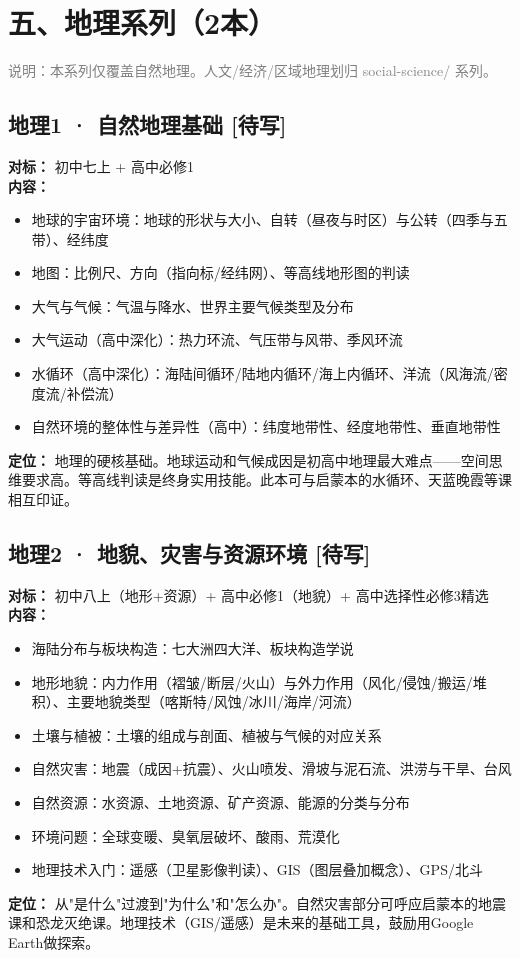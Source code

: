 \documentclass[a4paper,12pt]{ctexart}
\newcommand{\plan}{\textcolor{planblue}{\textbf{[待写]}}}
\begin{document}
\newpage

\section*{\textcolor{orange!80!black}{五、地理系列（2本）}}

\textcolor{gray}{说明：本系列仅覆盖自然地理。人文/经济/区域地理划归 social-science/ 系列。}

\subsection*{地理1 · 自然地理基础 \plan}

\textbf{对标：} 初中七上 + 高中必修1\\
\textbf{内容：}
\begin{itemize}
  \item 地球的宇宙环境：地球的形状与大小、自转（昼夜与时区）与公转（四季与五带）、经纬度
  \item 地图：比例尺、方向（指向标/经纬网）、等高线地形图的判读
  \item 大气与气候：气温与降水、世界主要气候类型及分布
  \item 大气运动（高中深化）：热力环流、气压带与风带、季风环流
  \item 水循环（高中深化）：海陆间循环/陆地内循环/海上内循环、洋流（风海流/密度流/补偿流）
  \item 自然环境的整体性与差异性（高中）：纬度地带性、经度地带性、垂直地带性
\end{itemize}
\textbf{定位：} 地理的硬核基础。地球运动和气候成因是初高中地理最大难点——空间思维要求高。等高线判读是终身实用技能。此本可与启蒙本的水循环、天蓝晚霞等课相互印证。

\subsection*{地理2 · 地貌、灾害与资源环境 \plan}

\textbf{对标：} 初中八上（地形+资源）+ 高中必修1（地貌）+ 高中选择性必修3精选\\
\textbf{内容：}
\begin{itemize}
  \item 海陆分布与板块构造：七大洲四大洋、板块构造学说
  \item 地形地貌：内力作用（褶皱/断层/火山）与外力作用（风化/侵蚀/搬运/堆积）、主要地貌类型（喀斯特/风蚀/冰川/海岸/河流）
  \item 土壤与植被：土壤的组成与剖面、植被与气候的对应关系
  \item 自然灾害：地震（成因+抗震）、火山喷发、滑坡与泥石流、洪涝与干旱、台风
  \item 自然资源：水资源、土地资源、矿产资源、能源的分类与分布
  \item 环境问题：全球变暖、臭氧层破坏、酸雨、荒漠化
  \item 地理技术入门：遥感（卫星影像判读）、GIS（图层叠加概念）、GPS/北斗
\end{itemize}
\textbf{定位：} 从"是什么"过渡到"为什么"和"怎么办"。自然灾害部分可呼应启蒙本的地震课和恐龙灭绝课。地理技术（GIS/遥感）是未来的基础工具，鼓励用Google Earth做探索。
\end{document}
